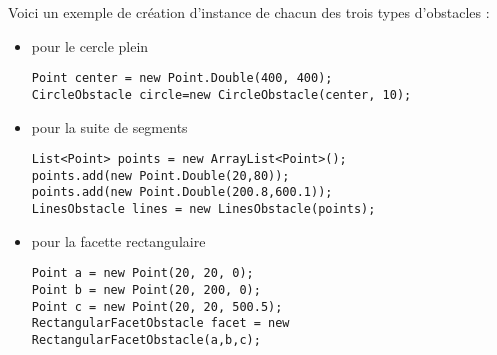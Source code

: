 \documentclass{article}
\begin{document}


Voici un exemple de création d'instance de chacun des trois types d'obstacles :\medskip

\begin{itemize}
\item pour le cercle plein\smallskip
\begin{lstlisting}[frame=single]
Point center = new Point.Double(400, 400);
CircleObstacle circle=new CircleObstacle(center, 10);
\end{lstlisting}\smallskip
\item pour la suite de segments\smallskip
\begin{lstlisting}[frame=single]
List<Point> points = new ArrayList<Point>();
points.add(new Point.Double(20,80));
points.add(new Point.Double(200.8,600.1));
LinesObstacle lines = new LinesObstacle(points);
\end{lstlisting}\smallskip
\item pour la facette rectangulaire\smallskip
\begin{lstlisting}[frame=single]
Point a = new Point(20, 20, 0);
Point b = new Point(20, 200, 0);
Point c = new Point(20, 20, 500.5);
RectangularFacetObstacle facet = new RectangularFacetObstacle(a,b,c);
\end{lstlisting}
\end{itemize}

%
%
\end{document}
